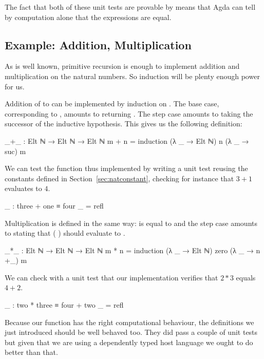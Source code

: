 \documentclass[twocolumn]{article}
\begin{document}
The fact that both of these unit tests are provable by  means
that Agda can tell by computation alone that the expressions are equal.

\subsection{Example: Addition, Multiplication}

As is well known, primitive recursion is enough to implement addition and
multiplication on the natural numbers. So induction will be plenty enough
power for us.

Addition of  to  can be implemented by induction on .
The base case, corresponding to  \AF{+} , amounts to returning
. The step case amounts to taking the successor of the inductive
hypothesis. This gives us the following definition:

\begin{code}
_+_ : Elt ℕ → Elt ℕ → Elt ℕ
m + n = induction (λ _ → Elt ℕ) n (λ _ → suc) m
\end{code}

We can test the function thus implemented by writing a unit test reusing
the constants defined in Section~\ref{sec:natconstant}, checking for instance
that $3+1$ evaluates to $4$.

\begin{code}
_ : three + one ≡ four
_ = refl
\end{code}

Multiplication is defined in the same way:  \AF{*} 
is equal to  and the step case amounts to stating that
( ) \AF{*}  should evaluate to
 \AF{+}  \AF{*} .

\begin{code}
_*_ : Elt ℕ → Elt ℕ → Elt ℕ
m * n = induction (λ _ → Elt ℕ) zero (λ _ → n +_) m
\end{code}

We can check with a unit test that our implementation verifies that
$2*3$ equals $4+2$.

\begin{code}
_ : two * three ≡ four + two
_ = refl
\end{code}

Because our  function has the right computational
behaviour, the definitions we just introduced should be well
behaved too.
They did pass a couple of unit tests but given that we are using a
dependently typed host language we ought to do better than that.
\end{document}

